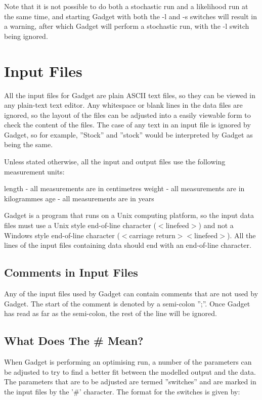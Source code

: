 \documentclass [a4paper, 10pt]{book}
\begin{document}
\bigskip
Note that it is not possible to do both a stochastic run and a likelihood run at the same time, and starting Gadget with both the -l and -s switches will result in a warning, after which Gadget will perform a stochastic run, with the -l switch being ignored.

\chapter{Input Files}\label{chap:input}
All the input files for Gadget are plain ASCII text files, so they can be viewed in any plain-text text editor.  Any whitespace or blank lines in the data files are ignored, so the layout of the files can be adjusted into a easily viewable form to check the content of the files.  The case of any text in an input file is ignored by Gadget, so for example, ''Stock'' and ''stock'' would be interpreted by Gadget as being the same.

\bigskip
Unless stated otherwise, all the input and output files use the following measurement units:\newline

length - all measurements are in centimetres\newline
weight - all measurements are in kilogrammes\newline
age - all measurements are in years

\bigskip
Gadget is a program that runs on a Unix computing platform, so the input data files must use a Unix style end-of-line character ($<$linefeed$>$) and not a Windows style end-of-line character ($<$carriage return$><$linefeed$>$).  All the lines of the input files containing data should end with an end-of-line character.

\section{Comments in Input Files}\label{sec:comments}
Any of the input files used by Gadget can contain comments that are not used by Gadget.  The start of the comment is denoted by a semi-colon '';''.  Once Gadget has read as far as the semi-colon, the rest of the line will be ignored.

\newpage %
\section{What Does The \# Mean?}\label{sec:whatdoeshash}
When Gadget is performing an optimising run, a number of the parameters can be adjusted to try to find a better fit between the modelled output and the data.  The parameters that are to be adjusted are termed ''switches'' and are marked in the input files by the '\#' character.  The format for the switches is given by:
\end{document}
